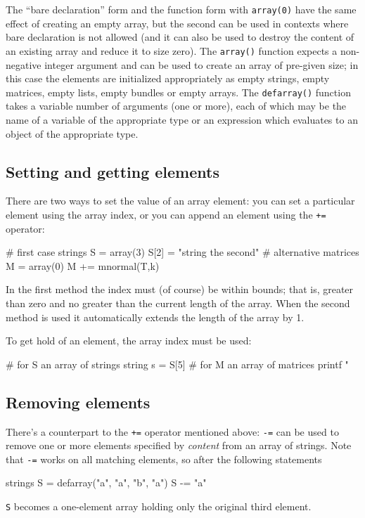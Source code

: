 The ``bare declaration'' form and the function form with
\texttt{array(0)} have
the same effect of creating an empty array, but the second can be used
in contexts where bare declaration is not allowed (and it can also be
used to destroy the content of an existing array and reduce it to size
zero). The \texttt{array()} function expects a non-negative integer
argument and can be used to create an array of pre-given size; in this
case the elements are initialized appropriately as empty strings, empty
matrices, empty lists, empty bundles or empty arrays. The
\texttt{defarray()} function takes a variable number of arguments (one
or more), each of which may be the name of a variable of the
appropriate type or an expression which evaluates to an object of the
appropriate type.

\subsection{Setting and getting elements}

There are two ways to set the value of an array element: you can set a
particular element using the array index, or you can append an element
using the \texttt{+=} operator:
\begin{code}
# first case
strings S = array(3)
S[2] = "string the second"
# alternative
matrices M = array(0)
M += mnormal(T,k)
\end{code}

In the first method the index must (of course) be within bounds; that
is, greater than zero and no greater than the current length of the
array. When the second method is used it automatically extends the
length of the array by 1.

To get hold of an element, the array index must be used:
\begin{code}
# for S an array of strings
string s = S[5]
# for M an array of matrices
printf "\n%
\end{code}

\subsection{Removing elements}

There's a counterpart to the \texttt{+=} operator mentioned above:
\texttt{-=} can be used to remove one or more elements specified by
\textit{content} from an array of strings. Note that \texttt{-=} works
on all matching elements, so after the following statements
\begin{code}
strings S = defarray("a", "a", "b", "a")
S -= "a"
\end{code}
\texttt{S} becomes a one-element array holding only the original third
element.

